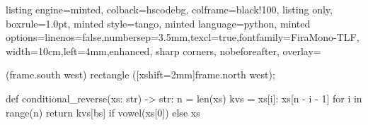\documentclass[border=0pt]{standalone}
\begin{document}
\begin{tcblisting}{
    listing engine=minted,
    colback=hscodebg,
    colframe=black!100,
    listing only,
    boxrule=1.0pt,
    minted style=tango,
    minted language=python,
    minted options={linenos=false,numbersep=3.5mm,texcl=true,fontfamily=FiraMono-TLF},
    width=10cm,left=4mm,enhanced,
    sharp corners,
    nobeforeafter,
    overlay={\begin{tcbclipinterior}\fill[bmidnight] (frame.south west)
            rectangle ([xshift=2mm]frame.north west);\end{tcbclipinterior}}
}
def conditional_reverse(xs: str) -> str:
    n = len(xs)
    kvs = {xs[i]: xs[n - i - 1] for i in range(n)}
    return kvs[bs] if vowel(xs[0]) else xs
\end{tcblisting}
\end{document}
